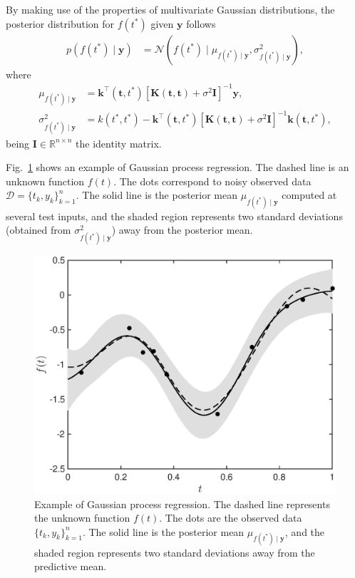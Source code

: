 \documentclass[journal]{IEEEtran}
\newcommand{\simo}[1]{{\color{red}#1}}
\begin{document}
By making use of the properties of multivariate Gaussian distributions, the posterior distribution for $f(t^*)$ given
$\mathbf{y}$ follows
\begin{align*}
p(f(t^*) \mid \mathbf{y}) & =\mathcal{N}(f(t^*) \mid \mu_{f(t^*) \mid \mathbf{y}}, \sigma^2_{f(t^*) \mid \mathbf{y}}),
\end{align*}
where
\begin{align*}
\mu_{f(t^*) \mid \mathbf{y}} & = \mathbf{k}^{\top}(\mathbf{t}, t^*)\left[\mathbf{K}(\mathbf{t}, \mathbf{t}) +
\sigma^2\mathbf{I}\right]^{-1}\mathbf{y},\\
\sigma^2_{f(t^*) \mid \mathbf{y}} & = k(t^*, t^*) - \mathbf{k}^{\top}(\mathbf{t}, t^*)\left[\mathbf{K}(\mathbf{t}, \mathbf{t}) +
\sigma^2\mathbf{I}\right]^{-1}\mathbf{k}(\mathbf{t}, t^*),
\end{align*}
being $\mathbf{I}\in\mathbb{R}^{n\times n}$ the identity matrix.

Fig.~\ref{reg_ex} shows an example of Gaussian process regression. The dashed line is an unknown function $f(t)$. The
dots correspond to noisy observed data $\mathcal{D} = \{t_k,y_k\}_{k=1}^n$. The solid line is the posterior mean
$\mu_{f(t^*) \mid \mathbf{y}}$ computed at several test inputs, and the shaded region represents two standard deviations
(obtained from $\sigma^2_{f(t^*) \mid \mathbf{y}}$) away from the posterior mean.

\begin{figure}[!t]
\centering
\includegraphics[width=0.9\columnwidth]{toyGPoutput}
\caption{Example of Gaussian process regression.  The dashed line represents the unknown function $f(t)$. The dots are
  the observed data $\{t_k, y_k\}_{k=1}^n$. The solid line is the posterior mean $\mu_{f(t^*) \mid \mathbf{y}}$, and the
  shaded region represents two standard deviations away from the predictive mean.}
\label{reg_ex}
\end{figure}
\end{document}
